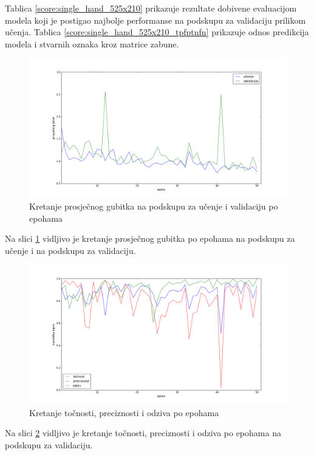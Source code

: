 \documentclass[times, utf8, diplomski, numeric]{fer}
\begin{document}
\noindent Tablica \ref{score:single_hand_525x210} prikazuje rezultate dobivene evaluacijom modela koji je postigao najbolje performanse na podskupu za validaciju prilikom učenja.
Tablica \ref{score:single_hand_525x210_tpfptnfn} prikazuje odnos predikcija modela i stvarnih oznaka kroz matrice zabune.

\begin{figure}[H]
\centering
\includegraphics[scale=0.35]{images/single_hand_scale075_loss.png}
\caption{Kretanje prosječnog gubitka na podskupu za učenje i validaciju po epohama}
\label{img:single_hand_scale075_loss}
\end{figure}
\noindent Na slici \ref{img:single_hand_scale075_loss} vidljivo je kretanje prosječnog gubitka po epohama na podskupu za učenje i na podskupu za validaciju.

\begin{figure}[H]
\centering
\includegraphics[scale=0.35]{images/single_hand_scale075_acc_ap.png}
\caption{Kretanje točnosti, preciznosti i odziva po epohama}
\label{img:single_hand_scale075_acc_ap}
\end{figure}
\noindent Na slici \ref{img:single_hand_scale075_acc_ap} vidljivo je kretanje točnosti, preciznosti i odziva po epohama na podskupu za validaciju.
\end{document}
